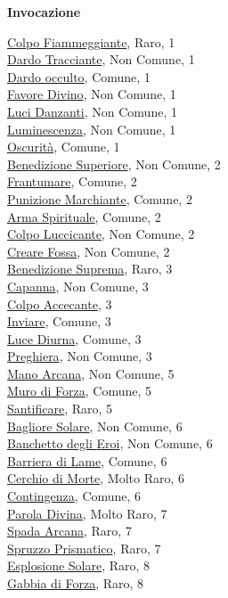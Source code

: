 \begin{multicols}{3}
{{\medskip\textbf{Invocazione}

\hyperlink{Colpo Fiammeggiante}{Colpo Fiammeggiante}, Raro, 1\\
\hyperlink{Dardo Tracciante}{Dardo Tracciante}, Non Comune, 1\\
\hyperlink{Dardo occulto}{Dardo occulto}, Comune, 1\\
\hyperlink{Favore Divino}{Favore Divino}, Non Comune, 1\\
\hyperlink{Luci Danzanti}{Luci Danzanti}, Non Comune, 1\\
\hyperlink{Luminescenza}{Luminescenza}, Non Comune, 1\\
\hyperlink{Oscurità}{Oscurità}, Comune, 1\\
\hyperlink{Benedizione Superiore}{Benedizione Superiore}, Non Comune, 2\\
\hyperlink{Frantumare}{Frantumare}, Comune, 2\\
\hyperlink{Punizione Marchiante}{Punizione Marchiante}, Comune, 2\\
\hyperlink{Arma Spirituale}{Arma Spirituale}, Comune, 2\\
\hyperlink{Colpo Luccicante}{Colpo Luccicante}, Non Comune, 2\\
\hyperlink{Creare Fossa}{Creare Fossa}, Non Comune, 2\\
\hyperlink{Benedizione Suprema}{Benedizione Suprema}, Raro, 3\\
\hyperlink{Capanna}{Capanna}, Non Comune, 3\\
\hyperlink{Colpo Accecante}{Colpo Accecante}, 3\\
\hyperlink{Inviare}{Inviare}, Comune, 3\\
\hyperlink{Luce Diurna}{Luce Diurna}, Comune, 3\\
\hyperlink{Preghiera}{Preghiera}, Non Comune, 3\\
\hyperlink{Mano Arcana}{Mano Arcana}, Non Comune, 5\\
\hyperlink{Muro di Forza}{Muro di Forza}, Comune, 5\\
\hyperlink{Santificare}{Santificare}, Raro, 5\\
\hyperlink{Bagliore Solare}{Bagliore Solare}, Non Comune, 6\\
\hyperlink{Banchetto degli Eroi}{Banchetto degli Eroi}, Non Comune, 6\\
\hyperlink{Barriera di Lame}{Barriera di Lame}, Comune, 6\\
\hyperlink{Cerchio di Morte}{Cerchio di Morte}, Molto Raro, 6\\
\hyperlink{Contingenza}{Contingenza}, Comune, 6\\
\hyperlink{Parola Divina}{Parola Divina}, Molto Raro, 7\\
\hyperlink{Spada Arcana}{Spada Arcana}, Raro, 7\\
\hyperlink{Spruzzo Prismatico}{Spruzzo Prismatico}, Raro, 7\\
\hyperlink{Esplosione Solare}{Esplosione Solare}, Raro, 8\\
\hyperlink{Gabbia di Forza}{Gabbia di Forza}, Raro, 8\\

}}
\end{multicols}
